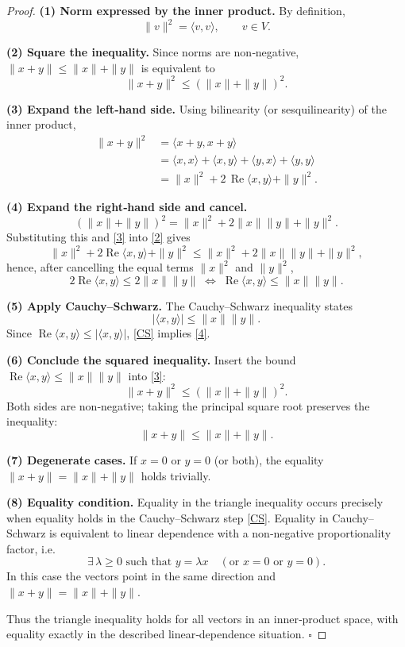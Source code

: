 \begin{proof}
\textbf{(1) Norm expressed by the inner product.}  
By definition,
\[
\|v\|^{2}= \langle v,v\rangle ,\qquad v\in V .
\tag{1}
\]

\textbf{(2) Square the inequality.}  
Since norms are non‑negative, \(\|x+y\|\le\|x\|+\|y\|\) is equivalent to
\[
\|x+y\|^{2}\le(\|x\|+\|y\|)^{2}.
\tag{2}
\]

\textbf{(3) Expand the left‑hand side.}  
Using bilinearity (or sesquilinearity) of the inner product,
\begin{align*}
\|x+y\|^{2}
&=\langle x+y,x+y\rangle \\
&=\langle x,x\rangle+\langle x,y\rangle+\langle y,x\rangle+\langle y,y\rangle \\
&=\|x\|^{2}+2\,\operatorname{Re}\langle x,y\rangle+\|y\|^{2}.
\end{align*}

\textbf{(4) Expand the right‑hand side and cancel.}  
\[
(\|x\|+\|y\|)^{2}= \|x\|^{2}+2\|x\|\|y\|+\|y\|^{2}.
\]
Substituting this and \eqref{3} into \eqref{2} gives
\[
\|x\|^{2}+2\operatorname{Re}\langle x,y\rangle+\|y\|^{2}
\le
\|x\|^{2}+2\|x\|\|y\|+\|y\|^{2},
\]
hence, after cancelling the equal terms \(\|x\|^{2}\) and \(\|y\|^{2}\),
\[
2\operatorname{Re}\langle x,y\rangle\le 2\|x\|\|y\|
\;\Longleftrightarrow\;
\operatorname{Re}\langle x,y\rangle\le\|x\|\|y\|.
\tag{4}
\]

\textbf{(5) Apply Cauchy–Schwarz.}  
The Cauchy–Schwarz inequality states
\[
|\langle x,y\rangle|\le\|x\|\|y\|.
\tag{CS}
\]
Since \(\operatorname{Re}\langle x,y\rangle\le|\langle x,y\rangle|\), \eqref{CS} implies \eqref{4}.

\textbf{(6) Conclude the squared inequality.}  
Insert the bound \(\operatorname{Re}\langle x,y\rangle\le\|x\|\|y\|\) into \eqref{3}:
\[
\|x+y\|^{2}\le(\|x\|+\|y\|)^{2}.
\]
Both sides are non‑negative; taking the principal square root preserves the inequality:
\[
\|x+y\|\le\|x\|+\|y\|.
\]

\textbf{(7) Degenerate cases.}  
If \(x=0\) or \(y=0\) (or both), the equality \(\|x+y\|=\|x\|+\|y\|\) holds trivially.

\textbf{(8) Equality condition.}  
Equality in the triangle inequality occurs precisely when equality holds in the Cauchy–Schwarz step \eqref{CS}.  Equality in Cauchy–Schwarz is equivalent to linear dependence with a non‑negative proportionality factor, i.e.
\[
\exists\,\lambda\ge0\text{ such that }y=\lambda x\quad(\text{or }x=0\text{ or }y=0).
\]
In this case the vectors point in the same direction and \(\|x+y\|=\|x\|+\|y\|\).

Thus the triangle inequality holds for all vectors in an inner‑product space, with equality exactly in the described linear‑dependence situation. \(\square\)
\end{proof}